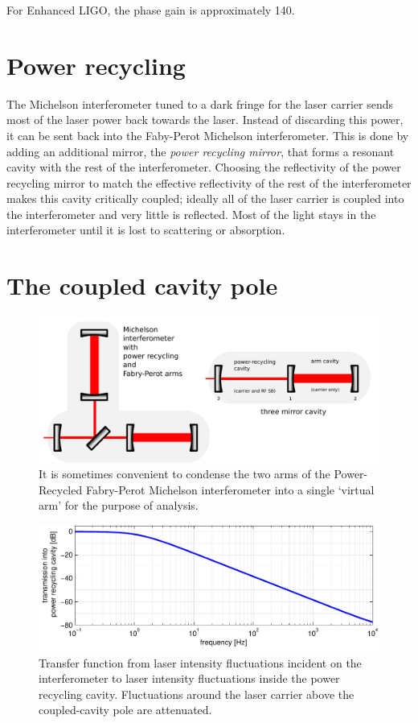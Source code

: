 For Enhanced LIGO, the phase gain is approximately 140.

\section{Power recycling}

The Michelson interferometer tuned to a dark fringe for the laser
carrier sends most of the laser power back towards the laser.  Instead
of discarding this power, it can be sent back into the Faby-Perot
Michelson interferometer.  This is done by adding an additional
mirror, the \emph{power recycling mirror}, that forms a resonant
cavity with the rest of the interferometer.  Choosing the reflectivity
of the power recycling mirror to match the effective reflectivity of
the rest of the interferometer makes this cavity critically coupled;
ideally all of the laser carrier is coupled into the interferometer
and very little is reflected.  Most of the light stays in the
interferometer until it is lost to scattering or absorption.

\section{The coupled cavity pole}

\begin{figure}
\includegraphics[width=\columnwidth]{figures/three-mirror-cavity.pdf}
\caption[Three mirror cavity]{It is sometimes convenient to condense the
two arms of the Power-Recycled Fabry-Perot Michelson interferometer into
a single `virtual arm' for the purpose of analysis.
\label{fig:three-mirror-cavity}}
\end{figure}

\begin{figure}
\includegraphics[width=\columnwidth]{figures/ccpole.pdf}
\caption[The coupled-cavity pole]{Transfer function from laser intensity
fluctuations incident on the interferometer to laser intensity fluctuations
inside the power recycling cavity.  Fluctuations around the laser carrier
above the coupled-cavity pole are attenuated.\label{fig:cctf}}
\end{figure}

